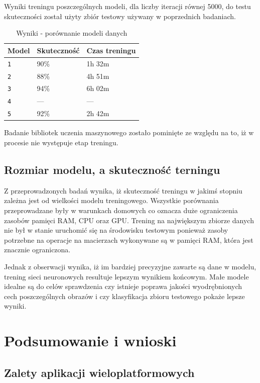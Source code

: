 \documentclass[brudnopis]{xmgr}
\begin{document}
Wyniki treningu poszczególnych modeli, dla liczby iteracji równej 5000, do testu skuteczności został użyty zbiór testowy używany w poprzednich badaniach.

\begin{table}[!htb]
\begin{tabular}{|l|l|l|} \hline
Model & Skuteczność & Czas treningu  \\ \hline
\texttt 1 & 90\% & 1h 32m \\ \hline
\texttt 2 & 88\% & 4h 51m \\ \hline
\texttt 3 & 94\% & 6h 02m \\ \hline
\texttt 4 & --- & --- \\ \hline 
\texttt 5 & 92\% & 2h 42m \\ \hline
\end{tabular}
\caption{Wyniki - porównanie modeli danych}
\end{table}

Badanie bibliotek uczenia maszynowego zostało pominięte ze względu na to, iż w procesie nie występuje etap treningu.

\section{Rozmiar modelu, a skuteczność terningu}

Z przeprowadzonych badań wynika, iż skuteczność treningu w jakimś stopniu zależna jest od wielkości modelu treningowego. Wszystkie porównania przeprowadzane były w warunkach domowych co oznacza duże ograniczenia zasobów pamięci RAM, CPU oraz GPU. Trening na największym zbiorze danych nie był w stanie uruchomić się na środowisku testowym ponieważ zasoby potrzebne na operacje na macierzach wykonywane są w pamięci RAM, która jest znacznie ograniczona. 

Jednak z obserwacji wynika, iż im bardziej precyzyjne zawarte są dane w modelu, trening sieci neuronowych resultuje lepszym wynikiem końcowym. Małe modele idealne są do celów sprawdzenia czy istnieje poprawa jakości wyodrębnionych cech poszczególnych obrazów i czy klasyfikacja zbioru testowego pokaże lepsze wyniki.

\chapter{Podsumowanie i wnioski}

\section{Zalety aplikacji wieloplatformowych}
\end{document}

